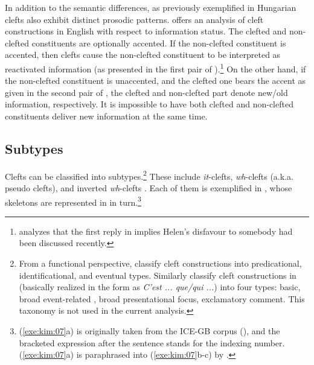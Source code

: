 In addition to the semantic differences, as previously exemplified in
Hungarian  clefts also exhibit distinct prosodic
patterns.  \citet{gussenhoven:07} offers an analysis of cleft
constructions in English with respect to information status.  The
clefted and non-clefted constituents are optionally accented.  If the
non-clefted constituent is accented, then clefts cause the non-clefted
constituent to be interpreted as reactivated information (as presented
in the first pair of
).\footnote{\citet{gussenhoven:07}
  analyzes that the first reply in
   implies Helen's disfavour
  to somebody had been discussed recently.}  On the other hand, if the
non-clefted constituent is unaccented, and the clefted one bears the
accent as given in the second pair of
, the clefted and
non-clefted part denote new/old information, respectively. It is
impossible to have both clefted and non-clefted constituents deliver
new information at the same time.



\subsection{Subtypes}
\label{10:sssec:clefts:subtypes}


Clefts can be classified into subtypes.\footnote{From a
  functional perspective, \citet{kim:yang:09} classify cleft
  constructions into predicational, identificational, and eventual
  types.  Similarly \citet{clech:99} classify cleft constructions in
   (basically realized in the form as \textit{C'est ... que/qui
    ...})  into four types: basic, broad event-related , broad
  presentational focus, exclamatory comment. This taxonomy is not used
  in the current analysis.}  These include \textit{it}-clefts,
\textit{wh}-clefts (a.k.a. pseudo clefts), and inverted
\textit{wh}-clefts \citep{kim:07}.  Each of them is exemplified in
, whose skeletons are represented in
 in turn.\footnote{(\ref{exe:kim:07}a) is
  originally taken from the ICE-GB corpus (\citealt{nelson:etal:02}),
  and the bracketed expression after the sentence stands for the
  indexing number. (\ref{exe:kim:07}a) is paraphrased into
  (\ref{exe:kim:07}b-c) by \citet{kim:07}.}


